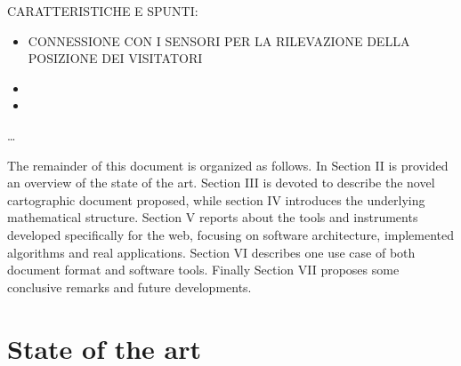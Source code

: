 \documentclass{sig-alternate}
\begin{document}
CARATTERISTICHE E SPUNTI:

\begin{itemize}
\item
 CONNESSIONE CON I SENSORI PER LA RILEVAZIONE DELLA POSIZIONE DEI
 VISITATORI
\item
\item
\end{itemize}

\ldots{}

The remainder of this document is organized as follows. In Section II is
provided an overview of the state of the art. Section III is devoted to
describe the novel cartographic document proposed, while section IV introduces
the underlying mathematical structure. Section V reports about the tools and
instruments developed specifically for the web, focusing on software
architecture, implemented algorithms and real applications. Section VI
describes one use case of both document format and software tools. Finally
Section VII proposes some conclusive remarks and future developments.

\section{State of the art}\label{state-of-the-art}
\end{document}

